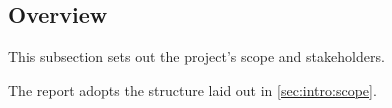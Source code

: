 
\subsection{Overview}\label{sec:intro:overview}


\qContext This subsection sets out the project's scope and stakeholders.

\qDecision The report adopts the structure laid out in \cref{sec:intro:scope}.
